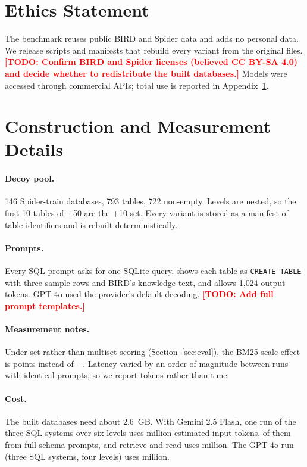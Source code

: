 \documentclass[11pt]{article}
\newif\ifdraft \drafttrue   %
\newcommand{\todo}[1]{\ifdraft\textcolor{red}{\textbf{[TODO: #1]}}\fi}
\begin{document}
\section*{Ethics Statement}
The benchmark reuses public BIRD and Spider data and adds no personal data. We release scripts and manifests that rebuild every variant from the original files. \todo{Confirm BIRD and Spider licenses (believed CC BY-SA 4.0) and decide whether to redistribute the built databases.} Models were accessed through commercial APIs; total use is reported in Appendix~\ref{app:details}.



\appendix

\section{Construction and Measurement Details}\label{app:details}
\paragraph{Decoy pool.} 146 Spider-train databases, 793 tables, 722 non-empty. Levels are nested, so the first 10 tables of +50 are the +10 set. Every variant is stored as a manifest of table identifiers and is rebuilt deterministically.

\paragraph{Prompts.} Every SQL prompt asks for one SQLite query, shows each table as \texttt{CREATE TABLE} with three sample rows and BIRD's knowledge text, and allows 1{,}024 output tokens. GPT-4o used the provider's default decoding. \todo{Add full prompt templates.}

\paragraph{Measurement notes.} Under set rather than multiset scoring (Section~\ref{sec:eval}), the BM25 scale effect is \bmSetDeltaPts{} points instead of $-$\bmDeltaAbsTop{}. Latency varied by an order of magnitude between runs with identical prompts, so we report tokens rather than time.

\paragraph{Cost.} The built databases need about 2.6~GB. With Gemini 2.5 Flash, one run of the three SQL systems over six levels uses \tokSqlRunM{} million estimated input tokens, \tokSqlFsShareP{} of them from full-schema prompts, and retrieve-and-read uses \tokRrRunM{} million. The GPT-4o run (three SQL systems, four levels) uses \tokGpRunM{} million.
\end{document}
